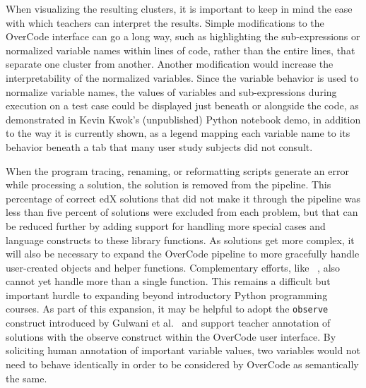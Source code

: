 \documentclass[12pt,twoside]{mitthesis}
\begin{document}
When visualizing the resulting clusters, it is important to keep in mind the ease with which teachers can interpret the results. Simple modifications to the OverCode interface can go a long way, such as highlighting the sub-expressions or normalized variable names within lines of code, rather than the entire lines, that separate one cluster from another. Another modification would increase the interpretability of the normalized variables. Since the variable behavior is used to normalize variable names, the values of variables and sub-expressions during execution on a test case could be displayed just beneath or alongside the code, as demonstrated in Kevin Kwok's (unpublished) Python notebook demo, in addition to the way it is currently shown, as a legend mapping each variable name to its behavior beneath a tab that many user study subjects did not consult. 



When the program tracing, renaming, or reformatting scripts generate an error while processing a solution, the solution is removed from the pipeline. This percentage of correct edX solutions that did not make it through the pipeline was less than five percent of solutions were excluded from each problem, but that can be reduced further by adding support for handling more special cases and language constructs to these library functions. As solutions get more complex, it will also be necessary to expand the OverCode pipeline to more gracefully handle user-created objects and helper functions. Complementary efforts, like ~\cite{choudhury2016autostyle}, also cannot yet handle more than a single function. This remains a difficult but important hurdle to expanding beyond introductory Python programming courses. As part of this expansion, it may be helpful to adopt the \texttt{observe} construct introduced by Gulwani et al.~\cite{gulwani_fse14} and support teacher annotation of solutions with the observe construct within the OverCode user interface. By soliciting human annotation of important variable values, two variables would not need to behave identically in order to be considered by OverCode as semantically the same.%
\end{document}

